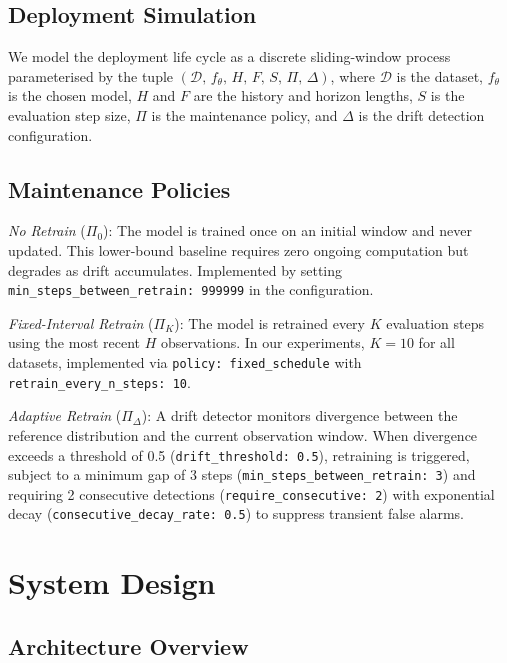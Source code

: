 \documentclass[conference]{IEEEtran}
\begin{document}
\subsection{Deployment Simulation}

We model the deployment life cycle as a discrete sliding-window
process parameterised by the tuple
$(\mathcal{D},\, f_\theta,\, H,\, F,\, S,\, \Pi,\, \Delta)$,
where $\mathcal{D}$ is the dataset, $f_\theta$ is the chosen model,
$H$ and $F$ are the history and horizon lengths, $S$ is the
evaluation step size, $\Pi$ is the maintenance policy, and $\Delta$
is the drift detection configuration.

\subsection{Maintenance Policies}

\textit{No Retrain} ($\Pi_0$): The model is trained once on an
initial window and never updated. This lower-bound baseline requires
zero ongoing computation but degrades as drift accumulates.
Implemented by setting \texttt{min\_steps\_between\_retrain: 999999}
in the configuration.

\textit{Fixed-Interval Retrain} ($\Pi_K$): The model is retrained
every $K$ evaluation steps using the most recent $H$ observations.
In our experiments, $K = 10$ for all datasets, implemented via
\texttt{policy: fixed\_schedule} with
\texttt{retrain\_every\_n\_steps: 10}.

\textit{Adaptive Retrain} ($\Pi_\Delta$): A drift detector monitors
divergence between the reference distribution and the current
observation window. When divergence exceeds a threshold of 0.5
(\texttt{drift\_threshold: 0.5}), retraining is triggered, subject
to a minimum gap of 3 steps (\texttt{min\_steps\_between\_retrain: 3})
and requiring 2 consecutive detections (\texttt{require\_consecutive:
	2}) with exponential decay (\texttt{consecutive\_decay\_rate: 0.5})
to suppress transient false alarms.

\section{System Design}

\subsection{Architecture Overview}
\end{document}
